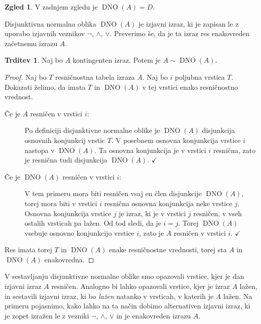 \documentclass[11pt]{book}
\DeclareMathOperator\DNO{DNO}
\def\kljuka{$\checkmark$}
\theoremstyle{definition}
\theoremstyle{zgled}
\newtheorem*{zgled}{Zgled}
\theoremstyle{odprtproblem}
\theoremstyle{domacanaloga}
\newenvironment{dokaz}
    {\color{siva}\begin{proof}}
    {\end{proof}}
\theoremstyle{izrek}
\newtheorem*{trditev}{Trditev}
\begin{document}
\begin{zgled}
V zadnjem zgledu je $\DNO(A) = D$.
\end{zgled}

Disjunktivna normalna oblika $\DNO(A)$ je izjavni izraz, ki je zapisan le z uporabo izjavnih veznikov $\lnot$, $\land$, $\lor$. Preverimo še, da je ta izraz res enakovreden začetnemu izrazu $A$.

\begin{trditev}
Naj bo $A$ kontingenten izraz. Potem je $A \sim \DNO(A)$.
\end{trditev}
\begin{dokaz}
Naj bo $T$ resničnostna tabela izraza $A$. Naj bo $i$ poljubna vrstica $T$. Dokazati želimo, da imata $T$ in $\DNO(A)$ v tej vrstici enako resničnostno vrednost.

\begin{description}
    \item[Če je $A$ resničen v vrstici $i$:] Po definiciji disjunktivne normalne oblike je $\DNO(A)$ disjunkcija osnovnih konjunkcij vrstic $T$. V posebnem osnovna konjunkcija vrstice $i$ nastopa v $\DNO(A)$. Ta osnovna konjunkcija je v vrstici $i$ resnična, zato je resnična tudi disjunkcija $\DNO(A)$. \kljuka
    \item[Če je $\DNO(A)$ resničen v vrstici $i$:] V tem primeru mora biti resničen vsaj en člen disjunkcije $\DNO(A)$, torej mora biti v vrstici $i$ resnična osnovna konjunkcija neke vrstice $j$. Osnovna konjunkcija vrstice $j$ je izraz, ki je v vrstici $j$ resničen, v vseh ostalih vrsticah pa lažen. Od tod sledi, da je $i = j$. Torej $\DNO(A)$ vsebuje osnovno konjunkcijo vrstice $i$, zato je $A$ resničen v vrstici $i$. \kljuka
\end{description}

Res imata torej $T$ in $\DNO(A)$ enake resničnostne vrednosti, torej sta $A$ in $\DNO(A)$ enakovredna.
\end{dokaz}

V sestavljanju disjunktivne normalne oblike smo opazovali vrstice, kjer je dan izjavni izraz $A$ resničen. Analogno bi lahko opazovali vrstice, kjer je izraz $A$ lažen, in sestavili izjavni izraz, ki bo \emph{lažen} natanko v vrsticah, v katerih je $A$ lažen. Na primeru pojasnimo, kako lahko na ta način dobimo alternativen izjavni izraz, ki je zopet izražen le z vezniki $\lnot$, $\land$, $\lor$ in je enakovreden izrazu $A$.
\end{document}
